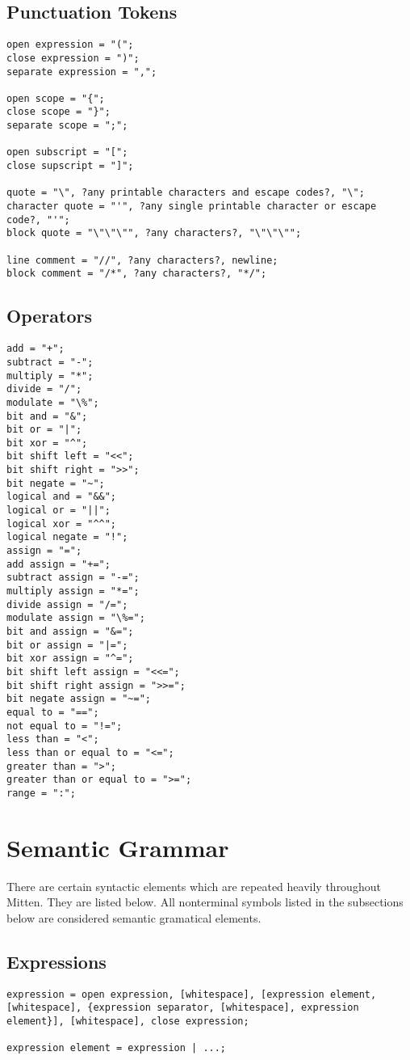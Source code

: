 \documentclass[10pt,a4paper]{article}
\begin{document}
\subsection{Punctuation Tokens}
\begin{verbatim}
open expression = "(";
close expression = ")";
separate expression = ",";

open scope = "{";
close scope = "}";
separate scope = ";";

open subscript = "[";
close supscript = "]";

quote = "\", ?any printable characters and escape codes?, "\";
character quote = "'", ?any single printable character or escape code?, "'";
block quote = "\"\"\"", ?any characters?, "\"\"\"";

line comment = "//", ?any characters?, newline;
block comment = "/*", ?any characters?, "*/";
\end{verbatim}

\subsection{Operators}
\begin{verbatim}
add = "+";
subtract = "-";
multiply = "*";
divide = "/";
modulate = "\%";
bit and = "&";
bit or = "|";
bit xor = "^";
bit shift left = "<<";
bit shift right = ">>";
bit negate = "~";
logical and = "&&";
logical or = "||";
logical xor = "^^";
logical negate = "!";
assign = "=";
add assign = "+=";
subtract assign = "-=";
multiply assign = "*=";
divide assign = "/=";
modulate assign = "\%=";
bit and assign = "&=";
bit or assign = "|=";
bit xor assign = "^=";
bit shift left assign = "<<=";
bit shift right assign = ">>=";
bit negate assign = "~=";
equal to = "==";
not equal to = "!=";
less than = "<";
less than or equal to = "<=";
greater than = ">";
greater than or equal to = ">=";
range = ":";
\end{verbatim}

\section{Semantic Grammar}
There are certain syntactic elements which are repeated heavily throughout Mitten. They are listed below. All nonterminal symbols listed in the subsections below are considered semantic gramatical elements.

\subsection{Expressions}
\begin{verbatim}
expression = open expression, [whitespace], [expression element, [whitespace], {expression separator, [whitespace], expression element}], [whitespace], close expression;

expression element = expression | ...;
\end{verbatim}
\end{document}
